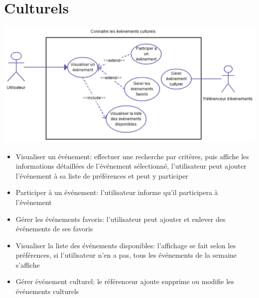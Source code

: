 \section{Culturels}
\includegraphics[scale=1,angle=90]{cu/Culturels.pdf}
\newpage
\begin{itemize}
\item Visualiser un événement: effectuer une recherche par critères, puis affiche les informations détaillées de l’événement sélectionné, l’utilisateur peut ajouter l’événement à sa liste de préférences et peut y participer
\item Participer à un événement: l'utilisateur informe qu'il participera à l'événement
\item Gérer les événements favoris: l’utilisateur peut ajouter et enlever des événements de ses favoris
\item Visualiser la liste des événements disponibles: l’affichage se fait selon les préférences, si l’utilisateur n’en a pas, tous les événements de la semaine s’affiche
\item Gérer événement culturel: le référenceur ajoute supprime ou modifie les événements culturels
\end{itemize}
\newpage



